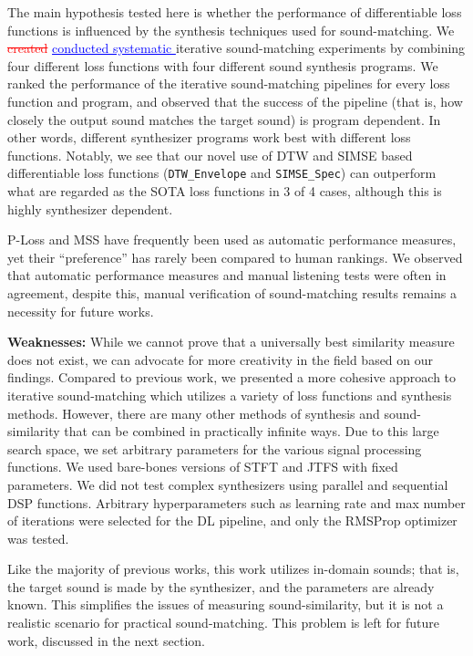 \documentclass[lettersize,journal]{IEEEtran}
\makeatletter
\renewcommand{\DIFadd}[1]{\textcolor{blue}{\uline{#1}}}
\renewcommand{\DIFdel}[1]{\textcolor{red}{\sout{#1}}}
\newcommand{\SIMSESpec}{\texttt{SIMSE\_Spec}}
\newcommand{\DTWEnv}{\texttt{DTW\_Envelope}}
\providecommand{\DIFadd}[1]{{\protect\color{blue}\uwave{#1}}} %
\providecommand{\DIFdel}[1]{{\protect\color{red}\sout{#1}}} %
\providecommand{\DIFaddbegin}{} %
\providecommand{\DIFaddend}{} %
\providecommand{\DIFdelbegin}{} %
\providecommand{\DIFdelend}{} %
\providecommand{\DIFscaledelfig}{0.5}
\newlength{\DIFdelgraphicswidth} %
\newlength{\DIFdelgraphicsheight} %
\providecommand{\DIFaddincludegraphics}[2][]{{\color{blue}\fbox{\DIFOincludegraphics[#1]{#2}}}} %
\providecommand{\DIFdelincludegraphics}[2][]{%
\sbox{\DIFdelgraphicsbox}{\DIFOincludegraphics[#1]{#2}}%
\settoboxwidth{\DIFdelgraphicswidth}{\DIFdelgraphicsbox} %
\settoboxtotalheight{\DIFdelgraphicsheight}{\DIFdelgraphicsbox} %
\scalebox{\DIFscaledelfig}{%
\parbox[b]{\DIFdelgraphicswidth}{\usebox{\DIFdelgraphicsbox}\\[-\baselineskip] \rule{\DIFdelgraphicswidth}{0em}}\llap{\resizebox{\DIFdelgraphicswidth}{\DIFdelgraphicsheight}{%
\setlength{\unitlength}{\DIFdelgraphicswidth}%
\begin{picture}(1,1)%
\thicklines\linethickness{2pt} %
{\color[rgb]{1,0,0}\put(0,0){\framebox(1,1){}}}%
{\color[rgb]{1,0,0}\put(0,0){\line( 1,1){1}}}%
{\color[rgb]{1,0,0}\put(0,1){\line(1,-1){1}}}%
\end{picture}%
}\hspace*{3pt}}} %
} %
\DeclareRobustCommand{\DIFaddbegin}{\DIFOaddbegin \let\includegraphics\DIFaddincludegraphics} %
\DeclareRobustCommand{\DIFaddend}{\DIFOaddend \let\includegraphics\DIFOincludegraphics} %
\DeclareRobustCommand{\DIFdelbegin}{\DIFOdelbegin \let\includegraphics\DIFdelincludegraphics} %
\DeclareRobustCommand{\DIFdelend}{\DIFOaddend \let\includegraphics\DIFOincludegraphics} %
\let\sout@orig\sout %
\renewcommand{\sout}[1]{\ifmmode\text{\sout@orig{\ensuremath{#1}}}\else\sout@orig{#1}\fi} %
\makeatother
\begin{document}
The main hypothesis tested here is whether the performance of differentiable loss functions is influenced by the synthesis techniques used for sound-matching. We \DIFdelbegin \DIFdel{created }\DIFdelend \DIFaddbegin \DIFadd{conducted systematic }\DIFaddend iterative sound-matching experiments by combining four different loss functions with four different sound synthesis programs. We ranked the performance of the iterative sound-matching pipelines for every loss function and program, and observed that the success of the pipeline (that is, how closely the output sound matches the target sound) is program dependent. In other words, different synthesizer programs work best with different loss functions. Notably, we see that our novel use of DTW and SIMSE based differentiable loss functions (\DTWEnv{} and \SIMSESpec) can outperform what are regarded as the SOTA loss functions in 3 of 4 cases, although this is highly synthesizer dependent. 



P-Loss and MSS have frequently been used as automatic performance measures, yet their ``preference'' has rarely been compared to human rankings. We observed that automatic performance measures and manual listening tests were often in agreement, despite this, manual verification of sound-matching results remains a necessity for future works.  

\textbf{Weaknesses:} 
While we cannot prove that a universally best similarity measure does not exist, we can advocate for more creativity in the field based on our findings. Compared to previous work, we presented a more cohesive approach to iterative sound-matching which utilizes a variety of loss functions and synthesis methods. However, there are many other methods of synthesis and sound-similarity that can be combined in practically infinite ways. Due to this large search space, we set arbitrary parameters for the various signal processing functions. We used bare-bones versions of STFT and JTFS with fixed parameters. We did not test complex synthesizers using parallel and sequential DSP functions. Arbitrary hyperparameters such as learning rate and max number of iterations were selected for the DL pipeline, and only the RMSProp optimizer was tested. 

 Like the majority of previous works, this work utilizes in-domain sounds; that is, the target sound is made by the synthesizer, and the parameters are already known. This simplifies the issues of measuring sound-similarity, but it is not a realistic scenario for practical sound-matching. This problem is left for future work, discussed in the next section.
\end{document}
